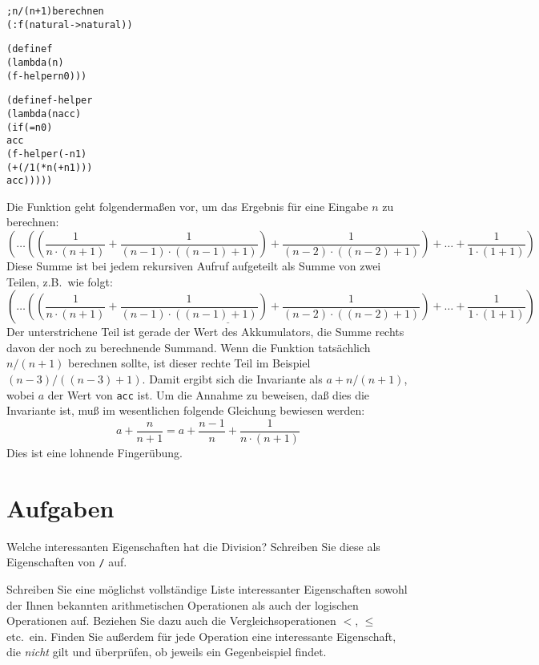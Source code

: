 \begin{alltt}
; n/(n+1) berechnen
(: f (natural -> natural))

(define f
  (lambda (n)
    (f-helper n 0)))

(define f-helper
  (lambda (n acc)
    (if (= n 0)
        acc
        (f-helper (- n 1)
                  (+ (/ 1 (* n (+ n 1)))
                     acc)))))
\end{alltt}
%
Die Funktion geht folgendermaßen vor, um das Ergebnis für eine Eingabe
$n$ zu berechnen:
%
\begin{displaymath}
  (\ldots ((\frac{1}{n \cdot (n + 1)}
  + \frac{1}{(n - 1) \cdot ((n - 1) + 1)})
  + \frac{1}{(n - 2) \cdot ((n - 2) + 1)})
  + \ldots
  + \frac{1}{1 \cdot (1 + 1)})
\end{displaymath}
%
Diese Summe ist bei jedem rekursiven Aufruf aufgeteilt als Summe von
zwei Teilen, z.B.\ wie folgt:
%
\begin{displaymath}
  (\ldots \underline{((\frac{1}{n \cdot (n + 1)}
  + \frac{1}{(n - 1) \cdot ((n - 1) + 1)})
  + \frac{1}{(n - 2) \cdot ((n - 2) + 1)})}
  + \ldots
  + \frac{1}{1 \cdot (1 + 1)})
\end{displaymath}
%
Der unterstrichene Teil ist gerade der Wert des Akkumulators, die
Summe rechts davon der noch zu berechnende Summand.  
Wenn die Funktion tatsächlich $n/(n+1)$ berechnen sollte, ist dieser
rechte Teil im Beispiel $(n-3)/((n-3)+1)$.  Damit ergibt
sich die Invariante als $a + n/(n+1)$, wobei $a$ der Wert von
\texttt{acc} ist.  Um die Annahme zu beweisen, daß dies die Invariante
ist, muß im wesentlichen folgende Gleichung bewiesen werden:
\[a+ \frac{n}{n+1} = a + \frac{n-1}{n} + \frac{1}{n\cdot (n+1)}\]
Dies ist eine lohnende Fingerübung.


\section*{Aufgaben}

\begin{aufgabe}
Welche interessanten Eigenschaften hat die Division?  Schreiben Sie
diese als Eigenschaften von \texttt{/} auf.
\end{aufgabe}

\begin{aufgabe}
  Schreiben Sie eine möglichst vollständige Liste interessanter
  Eigenschaften sowohl der Ihnen bekannten arithmetischen Operationen
  als auch der logischen Operationen auf.  Beziehen Sie dazu auch die
  Vergleichsoperationen $<$, $\leq$ etc.\ ein.  Finden Sie außerdem
  für jede Operation eine interessante Eigenschaft, die \emph{nicht}
  gilt und überprüfen, ob \drscheme{} jeweils ein Gegenbeispiel
  findet.
\end{aufgabe}

